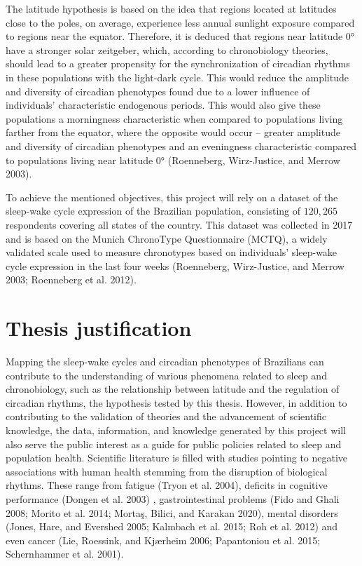 \documentclass[
  12pt,
  a4paper,
  oneside]{tesesusp}
\begin{document}
The latitude hypothesis is based on the idea that regions located at
latitudes close to the poles, on average, experience less annual
sunlight exposure compared to regions near the equator. Therefore, it is
deduced that regions near latitude 0° have a stronger solar zeitgeber,
which, according to chronobiology theories, should lead to a greater
propensity for the synchronization of circadian rhythms in these
populations with the light-dark cycle. This would reduce the amplitude
and diversity of circadian phenotypes found due to a lower influence of
individuals' characteristic endogenous periods. This would also give
these populations a morningness characteristic when compared to
populations living farther from the equator, where the opposite would
occur -- greater amplitude and diversity of circadian phenotypes and an
eveningness characteristic compared to populations living near latitude
0° (Roenneberg, Wirz-Justice, and Merrow 2003).

To achieve the mentioned objectives, this project will rely on a dataset
of the sleep-wake cycle expression of the Brazilian population,
consisting of \(120,265\) respondents covering all states of the
country. This dataset was collected in 2017 and is based on the Munich
ChronoType Questionnaire (MCTQ), a widely validated scale used to
measure chronotypes based on individuals' sleep-wake cycle expression in
the last four weeks (Roenneberg, Wirz-Justice, and Merrow 2003;
Roenneberg et al. 2012).

\hypertarget{thesis-justification}{%
\section{Thesis justification}\label{thesis-justification}}

Mapping the sleep-wake cycles and circadian phenotypes of Brazilians can
contribute to the understanding of various phenomena related to sleep
and chronobiology, such as the relationship between latitude and the
regulation of circadian rhythms, the hypothesis tested by this thesis.
However, in addition to contributing to the validation of theories and
the advancement of scientific knowledge, the data, information, and
knowledge generated by this project will also serve the public interest
as a guide for public policies related to sleep and population health.
Scientific literature is filled with studies pointing to negative
associations with human health stemming from the disruption of
biological rhythms. These range from fatigue (Tryon et al. 2004),
deficits in cognitive performance (Dongen et al. 2003) ,
gastrointestinal problems (Fido and Ghali 2008; Morito et al. 2014;
Mortaş, Bilici, and Karakan 2020), mental disorders (Jones, Hare, and
Evershed 2005; Kalmbach et al. 2015; Roh et al. 2012) and even cancer
(Lie, Roessink, and Kjærheim 2006; Papantoniou et al. 2015; Schernhammer
et al. 2001).
\end{document}
